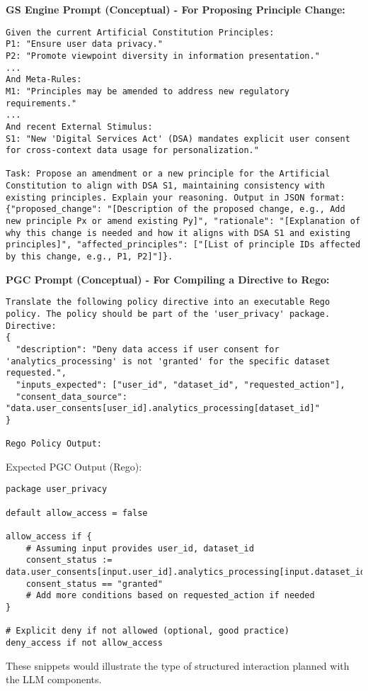 \documentclass[sigconf,review,screen]{acmart}
\begin{document}
\textbf{GS Engine Prompt (Conceptual) - For Proposing Principle Change:}
\begin{lstlisting}[caption={GS Engine Prompt Example},label={lst:gs_prompt},basicstyle=\ttfamily\footnotesize,breaklines=true,keepspaces=true]
Given the current Artificial Constitution Principles:
P1: "Ensure user data privacy."
P2: "Promote viewpoint diversity in information presentation."
...
And Meta-Rules:
M1: "Principles may be amended to address new regulatory requirements."
...
And recent External Stimulus:
S1: "New 'Digital Services Act' (DSA) mandates explicit user consent for cross-context data usage for personalization."

Task: Propose an amendment or a new principle for the Artificial Constitution to align with DSA S1, maintaining consistency with existing principles. Explain your reasoning. Output in JSON format: {"proposed_change": "[Description of the proposed change, e.g., Add new principle Px or amend existing Py]", "rationale": "[Explanation of why this change is needed and how it aligns with DSA S1 and existing principles]", "affected_principles": ["[List of principle IDs affected by this change, e.g., P1, P2]"]}.
\end{lstlisting}

\textbf{PGC Prompt (Conceptual) - For Compiling a Directive to Rego:}
\begin{lstlisting}[caption={PGC Prompt Example},label={lst:pgc_prompt},basicstyle=\ttfamily\footnotesize,breaklines=true,keepspaces=true]
Translate the following policy directive into an executable Rego policy. The policy should be part of the 'user_privacy' package.
Directive:
{
  "description": "Deny data access if user consent for 'analytics_processing' is not 'granted' for the specific dataset requested.",
  "inputs_expected": ["user_id", "dataset_id", "requested_action"],
  "consent_data_source": "data.user_consents[user_id].analytics_processing[dataset_id]"
}

Rego Policy Output:
\end{lstlisting}
Expected PGC Output (Rego):
\begin{lstlisting}[caption={PGC Compiled Rego Output Example},label={lst:pgc_rego_output},basicstyle=\ttfamily\footnotesize,breaklines=true,keepspaces=true]
package user_privacy

default allow_access = false

allow_access if {
    # Assuming input provides user_id, dataset_id
    consent_status := data.user_consents[input.user_id].analytics_processing[input.dataset_id]
    consent_status == "granted"
    # Add more conditions based on requested_action if needed
}

# Explicit deny if not allowed (optional, good practice)
deny_access if not allow_access
\end{lstlisting}
These snippets would illustrate the type of structured interaction planned with the LLM components.
\end{document}
